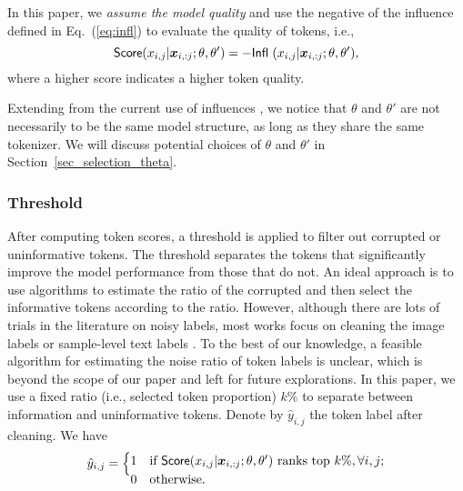In this paper, we \textit{assume the model quality} and use the negative of the influence defined in Eq.~(\ref{eq:infl}) to evaluate the quality of tokens, i.e., 
\begin{equation}\label{eq:score_func}
    \textsf{Score}(x_{i,j}|\bm x_{i, :j}; \theta, \theta') = - \textsf{Infl}_\textsf{\ }(x_{i,j}|\bm x_{i, :j}; \theta, \theta'),
\end{equation}
where a higher score indicates a higher token quality.

Extending from the current use of influences \cite{koh2017understanding,pang2024fairness}, we notice that $\theta$ and $\theta'$ are not necessarily to be the same model structure, as long as they share the same tokenizer. We will discuss potential choices of $\theta$ and $\theta'$ in Section~\ref{sec_selection_theta}.





\subsubsection{Threshold}

After computing token scores, a threshold is applied to filter out corrupted or uninformative tokens. The threshold separates the tokens that significantly improve the model performance from those that do not. An ideal approach is to use algorithms to estimate the ratio of the corrupted and then select the informative tokens according to the ratio. However, although there are lots of trials in the literature on noisy labels, most works focus on cleaning the image labels \cite{lad2023estimating} or sample-level text labels \cite{zhu2024unmasking,pang2024improving}. To the best of our knowledge, a feasible algorithm for estimating the noise ratio of token labels is unclear, which is beyond the scope of our paper and left for future explorations. In this paper, we use a fixed ratio (i.e., selected token proportion) $k\%$ to separate between information and uninformative tokens. Denote by $\hat y_{i,j}$ the token label after cleaning. We have
\begin{align}\label{eq:thre}
       \hat y_{i,j}= \begin{cases}
1 & \text{if } \textsf{Score}(x_{i,j}|\bm x_{i, :j}; \theta, \theta') \text{ ranks top } k\%, \forall i,j;  \\
0 & \text{otherwise}.
\vspace{-10pt}
\end{cases}
\end{align}


